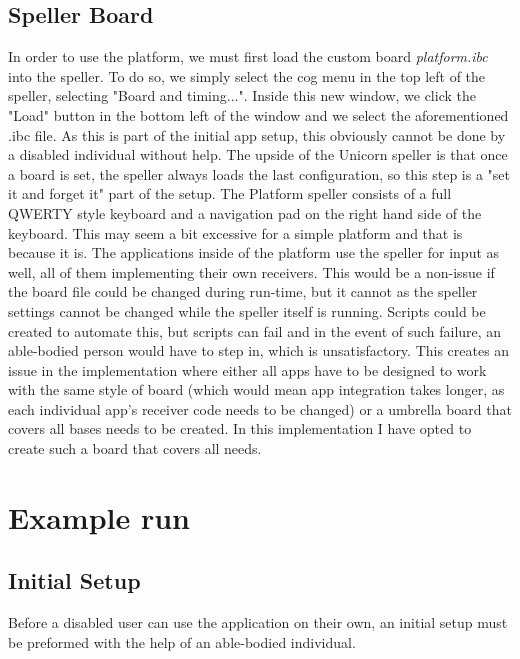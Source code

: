 \subsection{Speller Board}
In order to use the platform, we must first load the custom board \textit{platform.ibc} into the speller. To do so, we simply select the cog menu in the top left of the speller, selecting "Board and timing...". Inside this new window, we click the "Load" button in the bottom left of the window and we select the aforementioned .ibc file. As this is part of the initial app setup, this obviously cannot be done by a disabled individual without help. The upside of the Unicorn speller is that once a board is set, the speller always loads the last configuration, so this step is a "set it and forget it" part of the setup.
\vspace{\baselineskip}\newline
The Platform speller consists of a full QWERTY style keyboard and a navigation pad on the right hand side of the keyboard. This may seem a bit excessive for a simple platform and that is because it is. The applications inside of the platform use the speller for input as well, all of them implementing their own receivers. This would be a non-issue if the board file could be changed during run-time, but it cannot as the speller settings cannot be changed while the speller itself is running. Scripts could be created to automate this, but scripts can fail and in the event of such failure, an able-bodied person would have to step in, which is unsatisfactory. This creates an issue in the implementation where either all apps have to be designed to work with the same style of board (which would mean app integration takes longer, as each individual app's receiver code needs to be changed) or a umbrella board that covers all bases needs to be created. In this implementation I have opted to create such a board that covers all needs.



\section{Example run}
\subsection{Initial Setup}
Before a disabled user can use the application on their own, an initial setup must be preformed with the help of an able-bodied individual.
